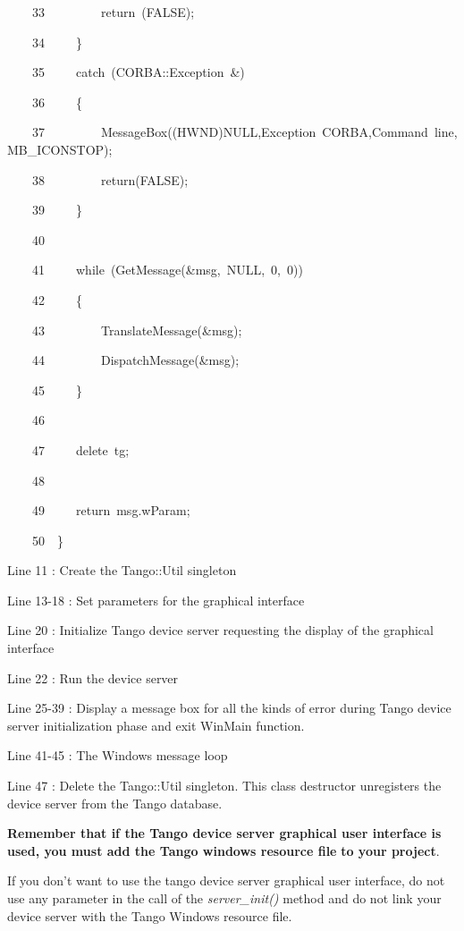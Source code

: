 \begin{lyxcode}
~~~~33~~~~~~~~~return~(FALSE);

~~~~34~~~~~\}

~~~~35~~~~~catch~(CORBA::Exception~\&)

~~~~36~~~~~\{

~~~~37~~~~~~~~~MessageBox((HWND)NULL,\textquotedbl{}Exception~CORBA\textquotedbl{},\textquotedbl{}Command~line\textquotedbl{},MB\_ICONSTOP);

~~~~38~~~~~~~~~return(FALSE);

~~~~39~~~~~\}

~~~~40~~

~~~~41~~~~~while~(GetMessage(\&msg,~NULL,~0,~0))~

~~~~42~~~~~\{

~~~~43~~~~~~~~~TranslateMessage(\&msg);

~~~~44~~~~~~~~~DispatchMessage(\&msg);

~~~~45~~~~~\}

~~~~46~~

~~~~47~~~~~delete~tg;

~~~~48~~

~~~~49~~~~~return~msg.wParam;

~~~~50~~\}
\end{lyxcode}


Line 11 : Create the Tango::Util singleton

Line 13-18 : Set parameters for the graphical interface

Line 20 : Initialize Tango device server requesting the display of
the graphical interface

Line 22 : Run the device server

Line 25-39 : Display a message box for all the kinds of error during
Tango device server initialization phase and exit WinMain
function.

Line 41-45 : The Windows message loop

Line 47 : Delete the Tango::Util singleton. This class destructor
unregisters the device server from the Tango database.

\textbf{Remember that if the Tango device server graphical user interface
is used, you must add the Tango windows resource
file} \textbf{to your project}.

If you don't want to use the tango device server graphical user interface,
do not use any parameter in the call of the \emph{server\_init()}
method and do not link your device server with the Tango Windows resource
file.


